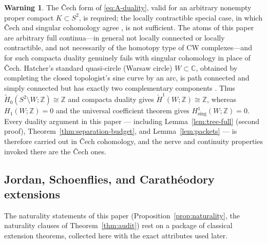 \documentclass[11pt,reqno]{amsart}
\theoremstyle{definition}
\newtheorem{warning}[theorem]{Warning}
\theoremstyle{remark}
\newcommand{\C}{\mathbb C}
\newcommand{\Z}{\mathbb Z}
\begin{document}
\begin{warning}\label{warn:A-cech}
The \v{C}ech form of \eqref{eq:A-duality}, valid for an arbitrary
nonempty proper compact $K\subset S^2$, is required; the locally
contractible special case, in which \v{C}ech and singular cohomology
agree \cite{Hat02}, is not sufficient.  The atoms of this paper are
arbitrary full continua---in general not locally connected or locally
contractible, and not necessarily of the homotopy type of CW
complexes---and for such compacta duality genuinely fails with singular
cohomology in place of \v{C}ech.  Hatcher's standard quasi-circle (Warsaw
circle) $W\subset\C$, obtained by completing the closed topologist's sine
curve by an arc, is path connected and simply connected but has exactly two
complementary components \cite[Exercise~1.3.7 and pp.~255--256]{Hat02}.
Thus
$\widetilde H_0(S^2\setminus W;\Z)\cong\Z$ and compacta duality gives
$\check H^1(W;\Z)\cong\Z$, whereas $H_1(W;\Z)=0$ and the universal
coefficient theorem gives $H^1_{\mathrm{sing}}(W;\Z)=0$.  Every duality argument in this paper ---
including Lemma~\ref{lem:tree-full} (second proof),
Theorem~\ref{thm:separation-budget}, and Lemma~\ref{lem:packets} --- is therefore carried out in \v{C}ech
cohomology, and the nerve and continuity properties invoked there are the
\v{C}ech ones.
\end{warning}

\subsection{Jordan, Schoenflies, and Carath\'eodory extensions}
\label{subsec:A-extension}

The naturality statements of this paper
(Proposition~\ref{prop:naturality}, the naturality clauses of
Theorem~\ref{thm:audit}) rest on a package of classical extension
theorems, collected here with the exact attributes used later.
\end{document}
